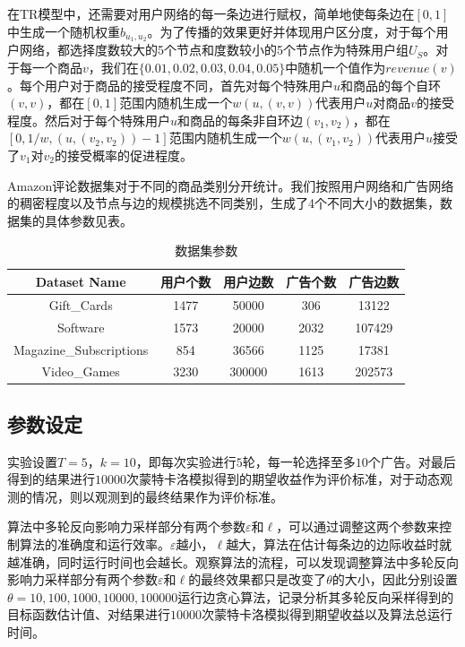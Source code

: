 在TR模型中，还需要对用户网络的每一条边进行赋权，简单地使每条边在$[0,1]$中生成一个随机权重$b_{u_1,u_2}$。为了传播的效果更好并体现用户区分度，对于每个用户网络，都选择度数较大的5个节点和度数较小的5个节点作为特殊用户组$U_S$。对于每一个商品$v$，我们在$\{0.01,0.02,0.03,0.04,0.05\}$中随机一个值作为$revenue(v)$。每个用户对于商品的接受程度不同，首先对每个特殊用户$u$和商品的每个自环$(v,v)$，都在$[0,1]$范围内随机生成一个$w(u,(v,v))$代表用户$u$对商品$v$的接受程度。然后对于每个特殊用户$u$和商品的每条非自环边$(v_1,v_2)$，都在$[0,1/w,(u,(v_2,v_2))-1]$范围内随机生成一个$w(u,(v_1,v_2))$代表用户$u$接受了$v_1$对$v_2$的接受概率的促进程度。

Amazon评论数据集对于不同的商品类别分开统计。我们按照用户网络和广告网络的稠密程度以及节点与边的规模挑选不同类别，生成了4个不同大小的数据集，数据集的具体参数见表\label{tab:imdata}。

\begin{table}[htbp]
	\setlength{\tabcolsep}{2mm}{}
	\centering
	\normalsize
	\caption{数据集参数}\label{tab:imdata}
	\begin{tabular}[t]{|c|c|c|c|c|}
        \hline
		Dataset Name & 用户个数 & 用户边数 & 广告个数 & 广告边数 \\ \hline
		Gift\_Cards & 1477 & 50000 & 306 & 13122 \\ \hline
		Software & 1573 & 20000 & 2032 & 107429 \\ \hline
		Magazine\_Subscriptions & 854 & 36566 & 1125 & 17381 \\ \hline
		Video\_Games & 3230 & 300000 & 1613 & 202573 \\ \hline
	\end{tabular}	
\end{table}

\subsection{参数设定}

实验设置$T=5$，$k=10$，即每次实验进行$5$轮，每一轮选择至多$10$个广告。对最后得到的结果进行$10000$次蒙特卡洛模拟得到的期望收益作为评价标准，对于动态观测的情况，则以观测到的最终结果作为评价标准。

算法中多轮反向影响力采样部分有两个参数$\varepsilon$和$\ell$，可以通过调整这两个参数来控制算法的准确度和运行效率。$\varepsilon$越小，$\ell$越大，算法在估计每条边的边际收益时就越准确，同时运行时间也会越长。观察算法的流程，可以发现调整算法中多轮反向影响力采样部分有两个参数$\varepsilon$和$\ell$的最终效果都只是改变了$\theta$的大小，因此分别设置$\theta=10,100,1000,10000,100000$运行边贪心算法，记录分析其多轮反向采样得到的目标函数估计值、对结果进行$10000$次蒙特卡洛模拟得到期望收益以及算法总运行时间。

